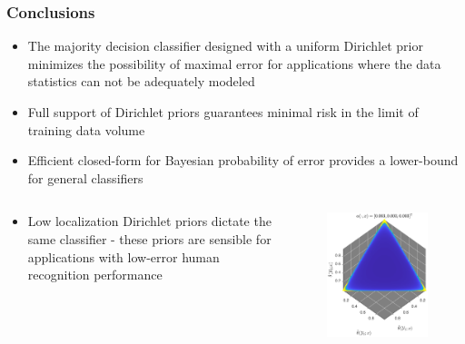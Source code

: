 \documentclass[aspectratio=169]{beamer}
\begin{document}
\begin{frame}
\frametitle{Conclusions}

\begin{itemize}
\item The majority decision classifier designed with a uniform Dirichlet prior minimizes the possibility of maximal error for applications where the data statistics can not be adequately modeled
\item Full support of Dirichlet priors guarantees minimal risk in the limit of training data volume
\item Efficient closed-form for Bayesian probability of error provides a lower-bound for general classifiers
\end{itemize}

\begin{columns}[T]

\begin{column}{.55\linewidth}

\begin{itemize}
\item Low localization Dirichlet priors dictate the same classifier - these priors are sensible for applications with low-error human recognition performance
\end{itemize}

\end{column}

\begin{column}{.4\linewidth}

\vspace{-2em}
\begin{figure}
\centering
\includegraphics[width=0.5\linewidth]{P_theta_highVar.pdf}
\label{fig:P_theta_highVar}
\end{figure}

\end{column}

\end{columns}


\end{frame}
\end{document}
